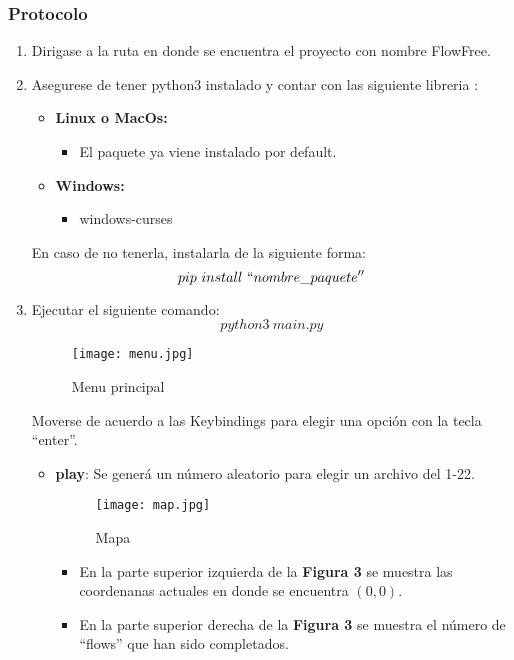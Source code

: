 \documentclass[letter]{article}
\begin{document}
\subsubsection{Protocolo}
\begin{enumerate}
	\item Dirigase a la ruta en donde se encuentra el proyecto con nombre FlowFree.
	\item Asegurese de tener python3 instalado y contar con las siguiente libreria :
	      \begin{itemize}
		      \item \textbf{Linux o MacOs:}
		            \begin{itemize}
			            \item El paquete ya viene instalado por default.
		            \end{itemize}
		      \item \textbf{Windows:}
		            \begin{itemize}
			            \item windows-curses
		            \end{itemize}
	      \end{itemize}
	      En caso de no tenerla, instalarla de la siguiente forma: $$
		      pip ~ install ~  ``nombre\_paquete''$$
	\item Ejecutar el siguiente comando: $$ python3 ~ main.py$$
	      \begin{figure}[H]
		      \centerline{\texttt{[image: menu.jpg]}}
		      \caption{Menu principal}
		      \label{fig}
	      \end{figure}
	      Moverse de acuerdo a las Keybindings para elegir una opci\'on con la tecla ``enter''.
	      \begin{itemize}
		      \item \textbf{play}: Se gener\'a un n\'umero aleatorio para elegir un archivo del 1-22.
		            \begin{figure}[H]
			            \centerline{\texttt{[image: map.jpg]}}
			            \caption{Mapa}
			            \label{fig}
		            \end{figure}
		            \begin{itemize}
			            \item En la parte superior izquierda de la \textbf{Figura 3} se muestra las coordenanas actuales en donde se encuentra $(0,0)$.
			            \item En la parte superior derecha de la \textbf{Figura 3} se muestra el n\'umero de ``flows'' que han sido completados.

\end{itemize}
\end{itemize}
\end{enumerate}
\end{document}
